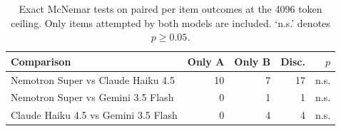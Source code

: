 \begin{table}[t]
\centering
\small
\begin{tabular}{lrrrr}
\toprule
Comparison & Only A & Only B & Disc. & $p$ \\
\midrule
Nemotron Super vs Claude Haiku 4.5 & 10 & 7 & 17 & n.s. \\
Nemotron Super vs Gemini 3.5 Flash & 0 & 1 & 1 & n.s. \\
Claude Haiku 4.5 vs Gemini 3.5 Flash & 0 & 4 & 4 & n.s. \\
\bottomrule
\end{tabular}
\caption{Exact McNemar tests on paired per item outcomes at the 4096 token ceiling. Only items attempted by both models are included. `n.s.' denotes $p \geq 0.05$.}
\label{tab:sig}
\end{table}
